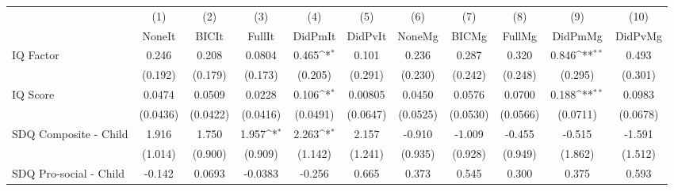 {
\def\sym#1{\ifmmode^{#1}\else\(^{#1}\)\fi}
\begin{tabular}{l*{10}{c}}
\toprule
            &\multicolumn{1}{c}{(1)}&\multicolumn{1}{c}{(2)}&\multicolumn{1}{c}{(3)}&\multicolumn{1}{c}{(4)}&\multicolumn{1}{c}{(5)}&\multicolumn{1}{c}{(6)}&\multicolumn{1}{c}{(7)}&\multicolumn{1}{c}{(8)}&\multicolumn{1}{c}{(9)}&\multicolumn{1}{c}{(10)}\\
            &\multicolumn{1}{c}{NoneIt}&\multicolumn{1}{c}{BICIt}&\multicolumn{1}{c}{FullIt}&\multicolumn{1}{c}{DidPmIt}&\multicolumn{1}{c}{DidPvIt}&\multicolumn{1}{c}{NoneMg}&\multicolumn{1}{c}{BICMg}&\multicolumn{1}{c}{FullMg}&\multicolumn{1}{c}{DidPmMg}&\multicolumn{1}{c}{DidPvMg}\\
\midrule
IQ Factor   &       0.246         &       0.208         &      0.0804         &       0.465\sym{*}  &       0.101         &       0.236         &       0.287         &       0.320         &       0.846\sym{**} &       0.493         \\
            &     (0.192)         &     (0.179)         &     (0.173)         &     (0.205)         &     (0.291)         &     (0.230)         &     (0.242)         &     (0.248)         &     (0.295)         &     (0.301)         \\
\addlinespace
IQ Score    &      0.0474         &      0.0509         &      0.0228         &       0.106\sym{*}  &     0.00805         &      0.0450         &      0.0576         &      0.0700         &       0.188\sym{**} &      0.0983         \\
            &    (0.0436)         &    (0.0422)         &    (0.0416)         &    (0.0491)         &    (0.0647)         &    (0.0525)         &    (0.0530)         &    (0.0566)         &    (0.0711)         &    (0.0678)         \\
\addlinespace
SDQ Composite - Child&       1.916         &       1.750         &       1.957\sym{*}  &       2.263\sym{*}  &       2.157         &      -0.910         &      -1.009         &      -0.455         &      -0.515         &      -1.591         \\
            &     (1.014)         &     (0.900)         &     (0.909)         &     (1.142)         &     (1.241)         &     (0.935)         &     (0.928)         &     (0.949)         &     (1.862)         &     (1.512)         \\
\addlinespace
SDQ Pro-social - Child&      -0.142         &      0.0693         &     -0.0383         &      -0.256         &       0.665         &       0.373         &       0.545         &       0.300         &       0.375         &       0.593         \\

\end{tabular}}
